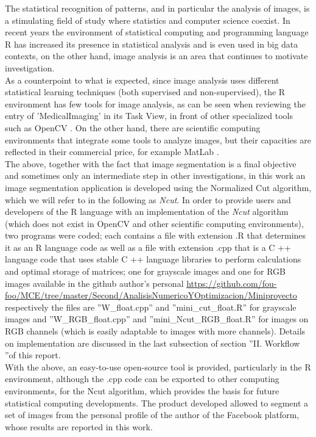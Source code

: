 \documentclass[conference]{IEEEtran}
\theoremstyle{definition}
\begin{document}
The statistical recognition of patterns, and in particular the analysis of images, is a stimulating field of study where statistics and computer science coexist. In recent years the environment of statistical computing and programming language R \cite{R} has increased its presence in statistical analysis and is even used in big data contexts, on the other hand, image analysis is an area that continues to motivate investigation.\\
As a counterpoint to what is expected, since image analysis uses different statistical learning techniques (both supervised and non-supervised), the R environment has few tools for image analysis, as can be seen when reviewing the entry of 'MedicalImaging' in its Task View, in front of other specialized tools such as OpenCV \cite{OpenCV}. On the other hand, there are scientific computing environments that integrate some tools to analyze images, but their capacities are reflected in their commercial price, for example MatLab \cite{MatLab}. \\
The above, together with the fact that image segmentation is a final objective and sometimes only an intermediate step in other investigations, in this work an image segmentation application is developed using the Normalized Cut algorithm, which we will refer to in the following as \textit{Ncut}. In order to provide users and developers of the R language with an implementation of the \textit{Ncut} algorithm (which does not exist in OpenCV and other scientific computing environments), two programs were coded; each contains a file with extension .R that determines it as an R language code as well as a file with extension .cpp that is a C ++ language code that uses stable C ++ language libraries to perform calculations and optimal storage of matrices;
one for grayscale images and one for RGB images available in the github author's personal \cite{github}  \url{https://github.com/fou-foo/MCE/tree/master/Second/AnalisisNumericoYOptimizacion/Miniproyecto} respectively the files are ''W\_float.cpp'' and ''mini\_cut\_float.R'' for grayscale images and ''W\_RGB\_float.cpp'' and ''mini\_Ncut\_RGB\_float.R'' for images on RGB channels (which is easily adaptable to images with more channels). Details on implementation are discussed in the last subsection of section ''II. Workflow ''of this report. \\
With the above, an easy-to-use open-source tool is provided, particularly in the R environment, although the .cpp code can be exported to other computing environments, for the Ncut algorithm, which provides the basis for future statistical computing developments. The product developed allowed to segment a set of images from the personal profile of the author of the Facebook \cite{Facebook} platform, whose results are reported in this work. \\
\end{document}

